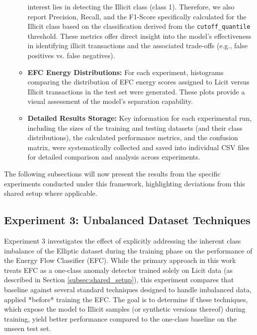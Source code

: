 \documentclass[12pt]{article}
\begin{document}
\begin{itemize}
\begin{itemize}
                interest lies in detecting the Illicit class (class 1). Therefore, we also report Precision, Recall, and
                the F1-Score specifically calculated for the Illicit class based on the classification derived from the
                \texttt{cutoff\_quantile} threshold. These metrics offer direct insight into the model's effectiveness in identifying
                illicit transactions and the associated trade-offs (e.g., false positives vs. false negatives).
              \item \textbf{EFC Energy Distributions:} For each experiment, histograms comparing the distribution of EFC
                energy scores assigned to Licit versus Illicit transactions in the test set were generated. These plots
                  provide a visual assessment of the model's separation capability.
              \item \textbf{Detailed Results Storage:} Key information for each experimental run, including the sizes of
                the training and testing datasets (and their class distributions), the calculated performance metrics,
                and the confusion matrix, were systematically collected and saved into individual CSV files for detailed
                comparison and analysis across experiments.
          \end{itemize}
\end{itemize}

The following subsections will now present the results from the specific experiments conducted under this framework, highlighting
deviations from this shared setup where applicable.

\subsection{Experiment 3: Unbalanced Dataset Techniques} \label{subsec:exp3_results}

Experiment 3 investigates the effect of explicitly addressing the inherent class imbalance of the Elliptic dataset during
the training phase on the performance of the Energy Flow Classifier (EFC). While the primary approach in this work treats
EFC as a one-class anomaly detector trained solely on Licit data (as described in Section \ref{subsec:shared_setup}), this
experiment compares that baseline against several standard techniques designed to handle imbalanced data, applied *before*
training the EFC. The goal is to determine if these techniques, which expose the model to Illicit samples (or synthetic
versions thereof) during training, yield better performance compared to the one-class baseline on the unseen test set.
\end{document}
